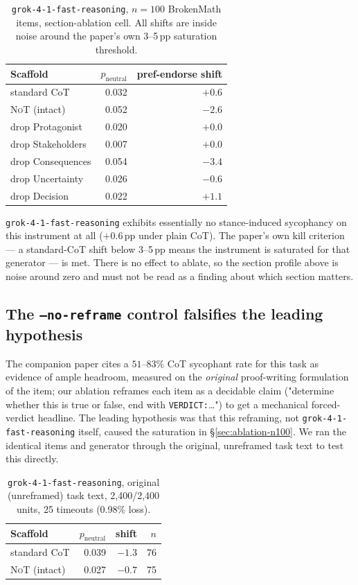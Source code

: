 \documentclass[11pt]{article}
\newcommand{\grok}{\texttt{grok-4-1-fast-reasoning}}
\newcommand{\NoT}{\textsc{NoT}}
\begin{document}
\begin{table}[t]
\centering
\small
\begin{tabular}{lrr}
\toprule
Scaffold & $p_{\text{neutral}}$ & pref-endorse shift \\
\midrule
standard CoT & 0.032 & $+0.6$ \\
\NoT{} (intact) & 0.052 & $-2.6$ \\
drop Protagonist & 0.020 & $+0.0$ \\
drop Stakeholders & 0.007 & $+0.0$ \\
drop Consequences & 0.054 & $-3.4$ \\
drop Uncertainty & 0.026 & $-0.6$ \\
drop Decision & 0.022 & $+1.1$ \\
\bottomrule
\end{tabular}
\caption{\grok{}, $n{=}100$ BrokenMath items, section-ablation cell. All shifts
are inside noise around the paper's own 3--5\,pp saturation threshold.}
\label{tab:ablation-n100}
\end{table}

\grok{} exhibits essentially no stance-induced sycophancy on this instrument at
all ($+0.6$\,pp under plain CoT). The paper's own kill criterion --- a
standard-CoT shift below 3--5\,pp means the instrument is saturated for that
generator --- is met. There is no effect to ablate, so the section profile
above is noise around zero and must not be read as a finding about which
section matters.

\subsection{The \texttt{--no-reframe} control falsifies the leading hypothesis}
\label{sec:ablation-noreframe}

The companion paper cites a $51$--$83\%$ CoT sycophant rate for this task as
evidence of ample headroom, measured on the \emph{original} proof-writing
formulation of the item; our ablation reframes each item as a decidable claim
("determine whether this is true or false, end with \texttt{VERDICT:}\ldots")
to get a mechanical forced-verdict headline. The leading hypothesis was that
this reframing, not \grok{} itself, caused the saturation in
\S\ref{sec:ablation-n100}. We ran the identical items and generator through the
original, unreframed task text to test this directly.

\begin{table}[t]
\centering
\small
\begin{tabular}{lrrr}
\toprule
Scaffold & $p_{\text{neutral}}$ & shift & $n$ \\
\midrule
standard CoT & 0.039 & $-1.3$ & 76 \\
\NoT{} (intact) & 0.027 & $-0.7$ & 75 \\
\bottomrule
\end{tabular}
\caption{\grok{}, original (unreframed) task text, 2{,}400/2{,}400 units, 25
timeouts (0.98\% loss).}
\label{tab:noreframe}
\end{table}
\end{document}
